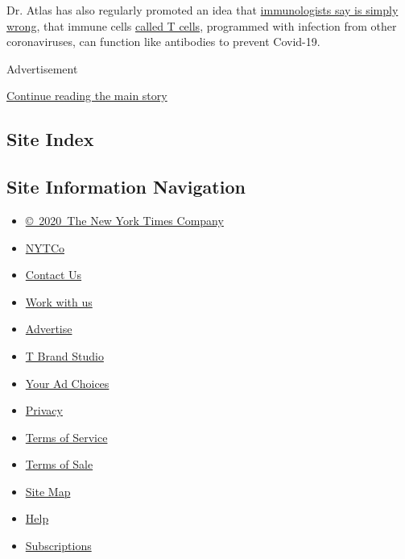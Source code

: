 Dr. Atlas has also regularly promoted an idea that
\href{https://twitter.com/profshanecrotty/status/1293344524731691008}{immunologists
say is simply wrong}, that immune cells
\href{https://www.nytimes3xbfgragh.onion/2020/08/06/health/coronavirus-immune-cells.html}{called
T cells}, programmed with infection from other coronaviruses, can
function like antibodies to prevent Covid-19.

Advertisement

\protect\hyperlink{after-bottom}{Continue reading the main story}

\hypertarget{site-index}{%
\subsection{Site Index}\label{site-index}}

\hypertarget{site-information-navigation}{%
\subsection{Site Information
Navigation}\label{site-information-navigation}}

\begin{itemize}
\tightlist
\item
  \href{https://help.nytimes3xbfgragh.onion/hc/en-us/articles/115014792127-Copyright-notice}{©~2020~The
  New York Times Company}
\end{itemize}

\begin{itemize}
\tightlist
\item
  \href{https://www.nytco.com/}{NYTCo}
\item
  \href{https://help.nytimes3xbfgragh.onion/hc/en-us/articles/115015385887-Contact-Us}{Contact
  Us}
\item
  \href{https://www.nytco.com/careers/}{Work with us}
\item
  \href{https://nytmediakit.com/}{Advertise}
\item
  \href{http://www.tbrandstudio.com/}{T Brand Studio}
\item
  \href{https://www.nytimes3xbfgragh.onion/privacy/cookie-policy\#how-do-i-manage-trackers}{Your
  Ad Choices}
\item
  \href{https://www.nytimes3xbfgragh.onion/privacy}{Privacy}
\item
  \href{https://help.nytimes3xbfgragh.onion/hc/en-us/articles/115014893428-Terms-of-service}{Terms
  of Service}
\item
  \href{https://help.nytimes3xbfgragh.onion/hc/en-us/articles/115014893968-Terms-of-sale}{Terms
  of Sale}
\item
  \href{https://spiderbites.nytimes3xbfgragh.onion}{Site Map}
\item
  \href{https://help.nytimes3xbfgragh.onion/hc/en-us}{Help}
\item
  \href{https://www.nytimes3xbfgragh.onion/subscription?campaignId=37WXW}{Subscriptions}
\end{itemize}

